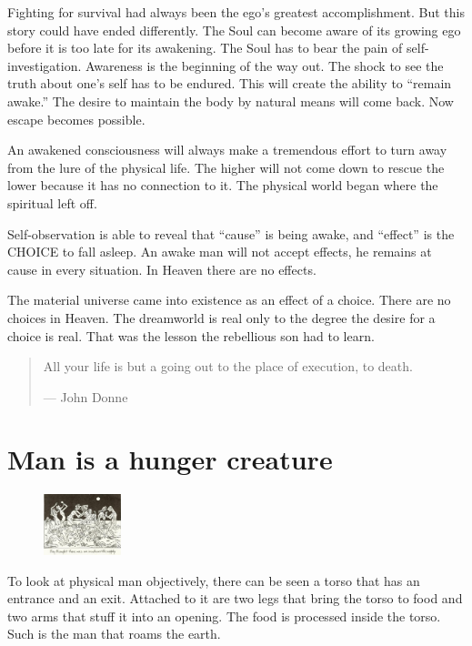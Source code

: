 \documentclass[landscape,twocolumn,letterpaper]{article}
\begin{document}
Fighting for survival had always been the ego's greatest
accomplishment. But this story could have ended differently. The Soul
can become aware of its growing ego before it is too late for its
awakening. The Soul has to bear the pain of
self-investigation. Awareness is the beginning of the way out. The
shock to see the truth about one's self has to be endured. This will
create the ability to ``remain awake.'' The desire to maintain the
body by natural means will come back. Now escape becomes possible.

An awakened consciousness will always make a tremendous effort to turn
away from the lure of the physical life. The higher will not come down
to rescue the lower because it has no connection to it. The physical
world began where the spiritual left off.

Self-observation is able to reveal that ``cause'' is being awake, and
``effect'' is the CHOICE to fall asleep. An awake man will not accept
effects, he remains at cause in every situation. In Heaven there are
no effects.

The material universe came into existence as an effect of a
choice. There are no choices in Heaven. The dreamworld is real only to
the degree the desire for a choice is real. That was the lesson the
rebellious son had to learn.

\begin{quotation} All your life is but a going out to the place of
execution, to death.

--- John Donne
\end{quotation}

\section{Man is a hunger creature}


\begin{figure}
  \includegraphics[width=0.2\textwidth,bb=0 0 463 334]{p6.jpg}
\end{figure}

To look at physical man objectively, there can be seen a torso that
has an entrance and an exit. Attached to it are two legs that bring
the torso to food and two arms that stuff it into an opening. The food
is processed inside the torso. Such is the man that roams the earth.
\end{document}
